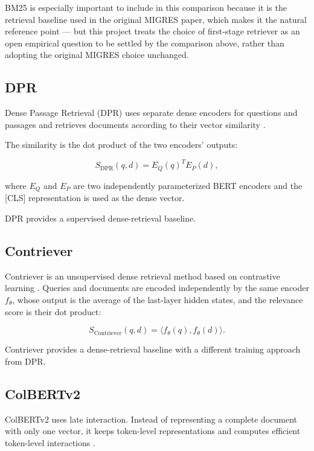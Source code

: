 \documentclass[11pt,a4paper]{article}
\begin{document}
BM25 is especially important to include in this comparison because it is the retrieval baseline used in the original MIGRES paper, which makes it the natural reference point --- but this project treats the choice of first-stage retriever as an open empirical question to be settled by the comparison above, rather than adopting the original MIGRES choice unchanged.

\subsection{DPR}

Dense Passage Retrieval (DPR) uses separate dense encoders for questions and passages and retrieves documents according to their vector similarity \citep{karpukhin-etal-2020-dense}.

The similarity is the dot product of the two encoders' outputs:

\[
S_{\mathrm{DPR}}(q,d)
=
E_Q(q)^{T}E_P(d),
\]

where $E_Q$ and $E_P$ are two independently parameterized BERT encoders and the [CLS] representation is used as the dense vector.

DPR provides a supervised dense-retrieval baseline.

\subsection{Contriever}

Contriever is an unsupervised dense retrieval method based on contrastive learning \citep{izacard-grave-2021-contriever}. Queries and documents are encoded independently by the same encoder $f_\theta$, whose output is the average of the last-layer hidden states, and the relevance score is their dot product:

\[
S_{\mathrm{Contriever}}(q,d)
=
\langle f_\theta(q),f_\theta(d)\rangle.
\]

Contriever provides a dense-retrieval baseline with a different training approach from DPR.

\subsection{ColBERTv2}

ColBERTv2 uses late interaction. Instead of representing a complete document with only one vector, it keeps token-level representations and computes efficient token-level interactions \citep{santhanam-etal-2022-colbertv2}.
\end{document}
